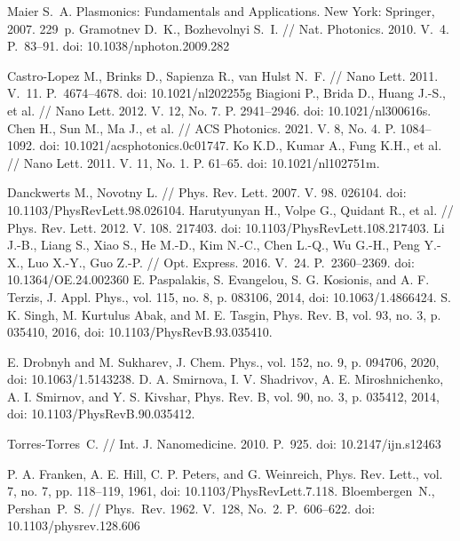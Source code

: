 \documentclass[12pt, a4paper]{article}
\begin{document}
\newpage
\begin{thebibliography}{99}
Maier S.~A. Plasmonics: Fundamentals and Applications. New York: Springer, 2007. 229~p.
Gramotnev D.~K., Bozhevolnyi S.~I. // Nat. Photonics. 2010. V.~4. P.~83--91. doi: 10.1038/nphoton.2009.282

Castro-Lopez M., Brinks D., Sapienza R., van Hulst N.~F. // Nano Lett. 2011. V.~11. P.~4674--4678. doi: 10.1021/nl202255g
Biagioni P., Brida D., Huang J.-S., et al. // Nano Lett. 2012. V. 12, No. 7. P. 2941–2946. doi: 10.1021/nl300616s.
Chen H., Sun M., Ma J., et al. // ACS Photonics. 2021. V. 8, No. 4. P. 1084–1092. doi: 10.1021/acsphotonics.0c01747.
Ko K.D., Kumar A., Fung K.H., et al. // Nano Lett. 2011. V. 11, No. 1. P. 61–65. doi: 10.1021/nl102751m.

Danckwerts M., Novotny L. // Phys. Rev. Lett. 2007. V. 98. 026104. doi: 10.1103/PhysRevLett.98.026104.
Harutyunyan H., Volpe G., Quidant R., et al. // Phys. Rev. Lett. 2012. V. 108. 217403. doi: 10.1103/PhysRevLett.108.217403.
Li J.-B., Liang S., Xiao S., He M.-D., Kim N.-C., Chen L.-Q., Wu G.-H., Peng Y.-X., Luo X.-Y., Guo Z.-P. // Opt. Express. 2016. V.~24. P.~2360--2369. doi: 10.1364/OE.24.002360
E. Paspalakis, S. Evangelou, S. G. Kosionis, and A. F. Terzis, {J. Appl. Phys.}, vol. 115, no. 8, p. 083106, 2014, doi: 10.1063/1.4866424.
S. K. Singh, M. Kurtulus Abak, and M. E. Tasgin, {Phys. Rev. B}, vol. 93, no. 3, p. 035410, 2016, doi: 10.1103/PhysRevB.93.035410.

E. Drobnyh and M. Sukharev, {J. Chem. Phys.}, vol. 152, no. 9, p. 094706, 2020, doi: 10.1063/1.5143238.
D. A. Smirnova, I. V. Shadrivov, A. E. Miroshnichenko, A. I. Smirnov, and Y. S. Kivshar, {Phys. Rev. B}, vol. 90, no. 3, p. 035412, 2014, doi: 10.1103/PhysRevB.90.035412.

Torres-Torres~C. // Int. J. Nanomedicine. 2010. P.~925. doi: 10.2147/ijn.s12463

P. A. Franken, A. E. Hill, C. P. Peters, and G. Weinreich, {Phys. Rev. Lett.}, vol. 7, no. 7, pp. 118–119, 1961, doi: 10.1103/PhysRevLett.7.118.
Bloembergen~N., Pershan~P.~S. // Phys.~Rev. 1962. V.~128, No.~2. P.~606--622. 
doi: 10.1103/physrev.128.606


\end{thebibliography}
\end{document}
